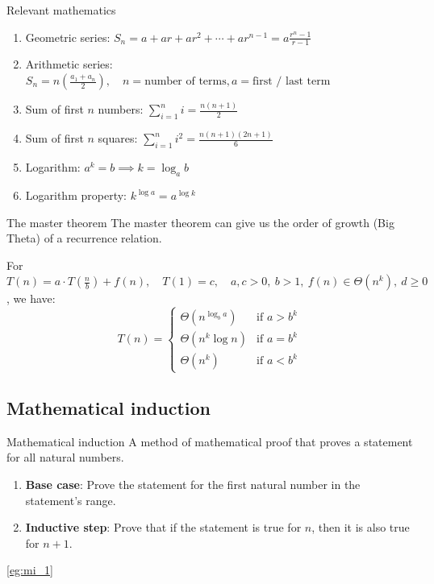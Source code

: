 \begin{knBox}
    {Relevant mathematics}
    \begin{enumerate}
        \item Geometric series: $S_n = a + ar + ar^2 + \cdots + ar^{n-1} = a\frac{r^n - 1}{r-1}$
        \item Arithmetic series: $S_n = n(\frac{a_1+a_n}{2}),\quad n=\text{number of terms}, a=\text{first / last term}$
        \item Sum of first $n$ numbers: $\sum_{i=1}^n i = \frac{n(n+1)}{2}$
        \item Sum of first $n$ squares: $\sum_{i=1}^n i^2 = \frac{n(n+1)(2n+1)}{6}$
        \item Logarithm: $a^k=b\implies k=\log_a b$
        \item Logarithm property: $k^{\log a} = a^{\log k}$
    \end{enumerate}
\end{knBox}

\begin{theorem}
    {The master theorem}
    The master theorem can give us the order of growth (Big Theta) of a recurrence relation.

    For $T(n) = a\cdot T(\frac{n}{b}) + f(n),\quad T(1) = c,\quad a, c > 0,\ b > 1,\ f(n)\in \Theta(n^k),\ d\geq 0$, we have:
    \[T(n) = \begin{cases}
            \Theta(n^{\log_b a}) & \text{if } a > b^k \\
            \Theta(n^k \log n)   & \text{if } a = b^k \\
            \Theta(n^k)          & \text{if } a < b^k
        \end{cases}\]
    \tcblower
    \label{thm:master_theorem}
\end{theorem}

\subsection{Mathematical induction}

\begin{definition}
    {Mathematical induction}
    A method of mathematical proof that proves a statement for all natural numbers.
    \begin{enumerate}
        \item \textbf{Base case}: Prove the statement for the first natural number in the statement's range.
        \item \textbf{Inductive step}: Prove that if the statement is true for $n$, then it is also true for $n+1$.
    \end{enumerate}
    \tcblower
    \ref{eg:mi_1}
    \label{def:mi}
\end{definition}